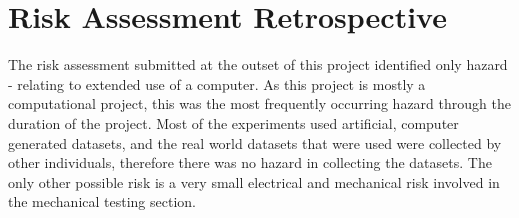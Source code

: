 \chapter{Risk Assessment Retrospective}
\label{sec:appendix2}

The risk assessment submitted at the outset of this project identified only hazard - relating to extended use of a computer. As this project is mostly a computational project, this was the most frequently occurring hazard through the duration of the project. Most of the experiments used artificial, computer generated datasets, and the real world datasets that were used were collected by other individuals, therefore there was no hazard in collecting the datasets. The only other possible risk is a very small electrical and mechanical risk involved in the mechanical testing section. 